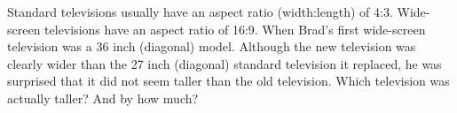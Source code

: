 \begin{prob}
Standard televisions usually have an aspect ratio (width:length) of 4:3.  Wide-screen televisions have an aspect ratio of 16:9.  When Brad's first wide-screen television was a 36 inch (diagonal) model.  Although the new television was clearly wider than the 27 inch (diagonal) standard television it replaced, he was surprised that it did not seem taller than the old television.  Which television was actually taller?  And by how much?  
\end{prob}



